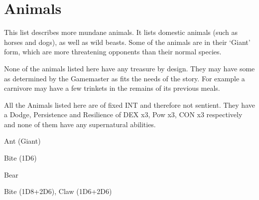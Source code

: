 
\section{Animals}

This list describes more mundane animals. It lists domestic animals (such as horses and dogs), as well as wild beasts. Some of the animals are in their ‘Giant’ form, which are more threatening opponents than their normal species.

None of the animals listed here have any treasure by design. They may have some as determined by the Gamemaster as fits the needs of the story. For example a carnivore may have a few trinkets in the remains of its previous meals.

All the Animals listed here are of fixed INT and therefore not sentient. They have a Dodge, Persistence and Resilience of DEX x3, Pow x3, CON x3 respectively and none of them have any supernatural abilities.

\vspace{1em}

\begin{samepage}
\begin{monsterbox}{Ant (Giant)}
	\basics[%
        hitpoints  = 12, 
	majorwound = 6,
	damagemodifier = 0,
	powerpoints = 6,
	movementrate = 15m,
	armor = Chitin (5 AP),
	]
	\rpghline%
	\stats[ %
		STR = 4D6   (14),
		CON = 3D6+6 (17),
		DEX = 2D6+6 (13),
		SIZ = 2D6   (7),
		INT = 2     (2),
		POW = 1D6+3 (6),
		CHA = 5     (5)
	]
	\rpghline%
	\begin{rpg-monsteraction}
		Bite (1D6)
	\end{rpg-monsteraction}
\end{monsterbox}
\end{samepage}


\begin{samepage}
\begin{monsterbox}{Bear}
	\basics[%
        hitpoints  = 19, 
	majorwound = 10,
	damagemodifier = 0,
	powerpoints = 11,
	movementrate = 23m,
	armor = Tough hide (3 AP),
	]
	\rpghline%
	\stats[ %
		STR = 3D6+15 (25),
		CON = 2D6+6  (13),
		DEX = 3D6    (11),
		SIZ = 3D6+15 (25),
		INT = 5     (5),
		POW = 3D6   (11),
		CHA = 5     (5)
	]
	\rpghline%
	\begin{rpg-monsteraction}
		Bite (1D8+2D6), Claw (1D6+2D6)
	\end{rpg-monsteraction}
\end{monsterbox}
\end{samepage}


